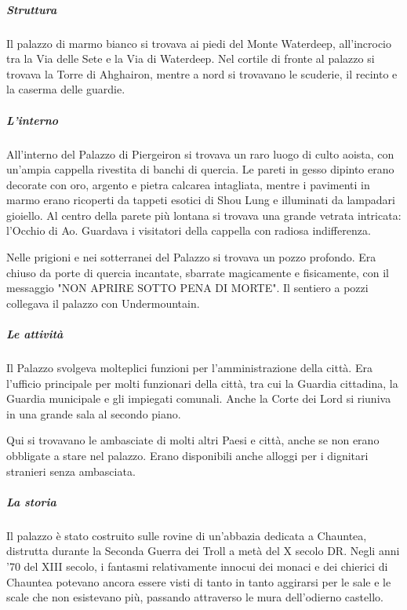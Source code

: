 \documentclass{article}
\begin{document}
                          \subparagraph{Struttura}
                          Il palazzo di marmo bianco si trovava ai piedi del Monte Waterdeep, all'incrocio tra la Via delle Sete e la Via di Waterdeep. Nel cortile di fronte al palazzo si trovava la Torre di Ahghairon, mentre a nord si trovavano le scuderie, il recinto e la caserma delle guardie.
                          
                          \subparagraph{L'interno}
                          All'interno del Palazzo di Piergeiron si trovava un raro luogo di culto aoista, con un'ampia cappella rivestita di banchi di quercia. Le pareti in gesso dipinto erano decorate con oro, argento e pietra calcarea intagliata, mentre i pavimenti in marmo erano ricoperti da tappeti esotici di Shou Lung e illuminati da lampadari gioiello. Al centro della parete più lontana si trovava una grande vetrata intricata: l'Occhio di Ao. Guardava i visitatori della cappella con radiosa indifferenza.
                          
                          Nelle prigioni e nei sotterranei del Palazzo si trovava un pozzo profondo. Era chiuso da porte di quercia incantate, sbarrate magicamente e fisicamente, con il messaggio "NON APRIRE SOTTO PENA DI MORTE". Il sentiero a pozzi collegava il palazzo con Undermountain.
                          
                          \subparagraph{Le attività}
                          Il Palazzo svolgeva molteplici funzioni per l'amministrazione della città. Era l'ufficio principale per molti funzionari della città, tra cui la Guardia cittadina, la Guardia municipale e gli impiegati comunali. Anche la Corte dei Lord si riuniva in una grande sala al secondo piano.
                          
                          Qui si trovavano le ambasciate di molti altri Paesi e città, anche se non erano obbligate a stare nel palazzo. Erano disponibili anche alloggi per i dignitari stranieri senza ambasciata.
                          
                          \subparagraph{La storia}
                          Il palazzo è stato costruito sulle rovine di un'abbazia dedicata a Chauntea, distrutta durante la Seconda Guerra dei Troll a metà del X secolo DR. Negli anni '70 del XIII secolo, i fantasmi relativamente innocui dei monaci e dei chierici di Chauntea potevano ancora essere visti di tanto in tanto aggirarsi per le sale e le scale che non esistevano più, passando attraverso le mura dell'odierno castello.
                          
\end{document}
